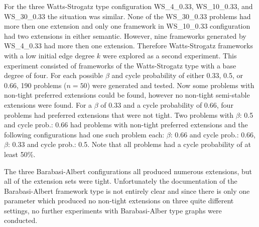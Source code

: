\documentclass[parskip=half]{scrartcl}
\begin{document}
For the three Watts-Strogatz type configuration WS\_4\_0.33, WS\_10\_0.33, and WS\_30\_0.33 the
situation was similar. None of the WS\_30\_0.33 problems had more then one extension and only
one framework in WS\_10\_0.33 configuration had two extensions in either semantic.
However, nine frameworks generated by WS\_4\_0.33 had more then one extension.
Therefore Watts-Strogatz frameworks
with a low initial edge degree $k$ were explored as a second experiment. This experiment consisted
of frameworks of the Watts-Strogatz type with a base degree of four. For each possible $\beta$
and cycle probability of either 0.33, 0.5, or 0.66, 190 problems ($n=50$) were generated and tested.
Now some problems with non-tight preferred extensions could be found, however no non-tight semi-stable
extensions were found. For a $\beta$ of 0.33 and a cycle probability of 0.66, four problems
had preferred extensions that were not tight. Two problems with $\beta$: 0.5 and cycle prob.: 0.66
had problems with non-tight preferred extensions and the following configurations had one such
problem each: $\beta$: 0.66 and cycle prob.: 0.66, $\beta$: 0.33 and cycle prob.: 0.5.
Note that all problems had a cycle probability of at least 50\%.


The three Barabasi-Albert configurations all produced numerous extensions, but
all of the extension sets were tight. Unfortunately the documentation of the Barabasi-Albert
framework type is not entirely clear and since there is only one parameter which produced
no non-tight extensions on three quite different settings, no further experiments with
Barabasi-Alber type graphs were conducted.
\end{document}
